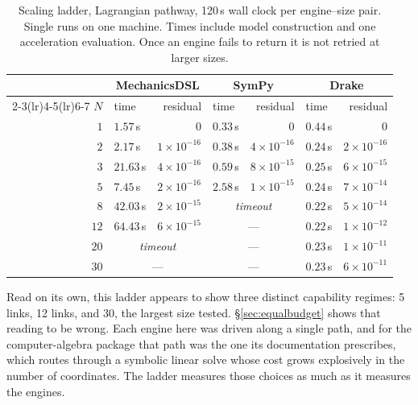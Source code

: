 \documentclass[review,12pt]{elsarticle}
\begin{document}
\begin{table}[!htbp]
\centering
\caption{Scaling ladder, Lagrangian pathway, 120\,s wall clock per
engine--size pair. Single runs on one machine. Times include model construction
and one acceleration evaluation. Once an engine fails to return it is not
retried at larger sizes.}
\label{tab:scaling}
\begin{tabular}{@{}rlrlrlr@{}}
\toprule
& \multicolumn{2}{c}{\textbf{MechanicsDSL}} & \multicolumn{2}{c}{\textbf{SymPy}} & \multicolumn{2}{c}{\textbf{Drake}} \\
\cmidrule(lr){2-3}\cmidrule(lr){4-5}\cmidrule(lr){6-7}
$N$ & time & residual & time & residual & time & residual \\
\midrule
$1$  & $1.57$\,s  & $0$                & $0.33$\,s  & $0$                & $0.44$\,s & $0$ \\
$2$  & $2.17$\,s  & $1\times10^{-16}$  & $0.38$\,s  & $4\times10^{-16}$  & $0.24$\,s & $2\times10^{-16}$ \\
$3$  & $21.63$\,s & $4\times10^{-16}$  & $0.59$\,s  & $8\times10^{-15}$  & $0.25$\,s & $6\times10^{-15}$ \\
$5$  & $7.45$\,s  & $2\times10^{-16}$  & $2.58$\,s  & $1\times10^{-15}$  & $0.24$\,s & $7\times10^{-14}$ \\
$8$  & $42.03$\,s & $2\times10^{-15}$  & \multicolumn{2}{c}{\emph{timeout}}  & $0.22$\,s & $5\times10^{-14}$ \\
$12$ & $64.43$\,s & $6\times10^{-15}$  & \multicolumn{2}{c}{---}             & $0.22$\,s & $1\times10^{-12}$ \\
$20$ & \multicolumn{2}{c}{\emph{timeout}}  & \multicolumn{2}{c}{---}        & $0.23$\,s & $1\times10^{-11}$ \\
$30$ & \multicolumn{2}{c}{---}             & \multicolumn{2}{c}{---}        & $0.23$\,s & $6\times10^{-11}$ \\
\bottomrule
\end{tabular}
\end{table}

Read on its own, this ladder appears to show three distinct capability
regimes: 5 links, 12 links, and 30, the largest size tested. \S\ref{sec:equalbudget}
shows that reading to be wrong. Each engine here was driven along a single
path, and for the computer-algebra package that path was the one its
documentation prescribes, which routes through a symbolic linear solve whose
cost grows explosively in the number of coordinates. The ladder measures
those choices as much as it measures the engines.
\end{document}
